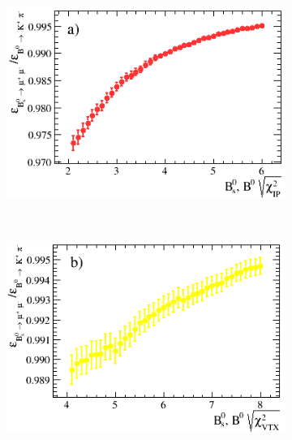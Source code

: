 \begin{figure}[tbp]
    \centering
    \begin{subfigure}[b]{0.48\textwidth}
        \includegraphics[width=\textwidth]{./Figs/Selection/Bs2MuMu_KPi_IP.png}
        \label{fig:IPS_ratioKPi}
    \end{subfigure}
    ~ %
    \begin{subfigure}[b]{0.48\textwidth}
        \includegraphics[width=\textwidth]{./Figs/Selection/BSMuMu_KPi_vertex.png}
        \label{fig:CHI2_ratioKPi}
    \end{subfigure}
    ~ %


\end{figure}
